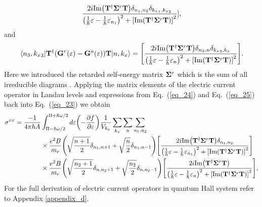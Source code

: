 \begin{widetext}
\begin{equation}
  \frac{2i \text{Im}\qty(\vb{T}^{\dagger} \vb{\Sigma}^r \vb{T})
  \delta_{n_1,n_2}\delta_{{k_x}_1,{k_x}_2}}
  {
  \qty(
  \frac{1}{\hbar}\varepsilon -
  \frac{1}{\hbar}\varepsilon_{n_1}
  )^2
  + \qty[\text{Im}\qty(\vb{T}^{\dagger} \vb{\Sigma}^r \vb{T})]^2
  }],
\end{equation}
and
\begin{equation} \label{eq_25}
  \mel{{n_3,{k_x}_3}}{
  \vb{T}^{\dagger}
  \qty(
  \vb{G}^{r} (\varepsilon) - \vb{G}^{a} (\varepsilon)
  )\vb{T}}
  {n,{k_x}} =
  \qty[
  \frac{2i \text{Im}\qty(\vb{T}^{\dagger} \vb{\Sigma}^r \vb{T})
  \delta_{n_3,n}\delta_{{k_x}_3,{k_x}}}
  {
  \qty(
  \frac{1}{\hbar}\varepsilon -
  \frac{1}{\hbar}\varepsilon_{n}
  )^2
  + \qty[\text{Im}\qty(\vb{T}^{\dagger} \vb{\Sigma}^r \vb{T})]^2
  }].
\end{equation}
Here we introduced the retarded self-energy matrix $\vb{\Sigma}^r$ which is the sum of all irreducible diagrams \cite{wackerl20,wackerlthesis20}. Applying the matrix elements of the electric current operator in Landau levels and
expressions from Eq.~(\ref{eq_24}) and Eq.~(\ref{eq_25}) back into Eq.~(\ref{eq_23}) we obtain
\begin{equation} \label{eq_26}
  \begin{aligned}
    {\sigma}^{xx}  =
    \frac{-1}{4\pi\hbar A} &
    \int_{\Pi-\hbar\omega/2}^{\Pi+ \hbar\omega/2} d\varepsilon
    \qty(
    -\frac{\partial f}{\partial \varepsilon})
    \frac{1}{V_{k_x}} \sum_{k_x} \sum_{n}
    \sum_{n_1,n_2}
    \\
    & \times
    \frac{e^2B}{{m_e}}
    \qty(\sqrt{\frac{n+1}{2}} \delta_{n_1,n+1} + \sqrt{\frac{n}{2}}
    \delta_{n_1,n-1})
    \qty[
    \frac{2i \text{Im}\qty(\vb{T}^{\dagger} \vb{\Sigma}^r \vb{T})
    \delta_{n_1,n_2}}
    {
    \qty(
    \frac{1}{\hbar}\varepsilon -
    \frac{1}{\hbar}\varepsilon_{n_1}
    )^2
    + \qty[\text{Im}\qty(\vb{T}^{\dagger} \vb{\Sigma}^r \vb{T})]^2
    }] \\
    & \times
    \frac{e^2B}{{m_e}}
    \qty(\sqrt{\frac{n_2+1}{2}} \delta_{n,n_2+1} + \sqrt{\frac{n_2}{2}}
    \delta_{n,n_2-1})
    \qty[
    \frac{2i \text{Im}\qty(\vb{T}^{\dagger} \vb{\Sigma}^r \vb{T})
    }
    {
    \qty(
    \frac{1}{\hbar}\varepsilon -
    \frac{1}{\hbar}\varepsilon_{n}
    )^2
    + \qty[\text{Im}\qty(\vb{T}^{\dagger} \vb{\Sigma}^r \vb{T})]^2
    }],
  \end{aligned}
\end{equation}
For the full derivation of electric current operators in quantum Hall system refer to Appendix \ref{appendix_d}.

\end{widetext}
